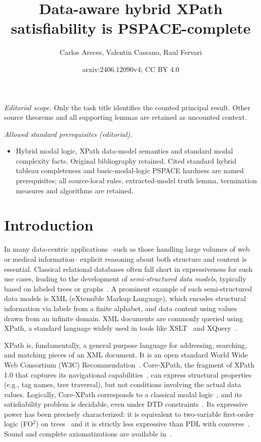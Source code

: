\documentclass[10pt,a4paper]{amsart}
\title{Data-aware hybrid XPath satisfiability is PSPACE-complete}
\author{Carlos Areces, Valentin Cassano, Raul Fervari}
\date{arxiv:2406.12090v4; CC BY 4.0}
\theoremstyle{definition}
\theoremstyle{remark}
\begin{document}
\maketitle
\noindent\textit{Editorial scope.} Only the task title identifies the counted principal result. Other source theorems and all supporting lemmas are retained as uncounted context.\par\medskip
\noindent\textit{Allowed standard prerequisites (editorial).}\begin{itemize}
\item Hybrid modal logic, XPath data-model semantics and standard modal complexity facts. Original bibliography retained. Cited standard hybrid tableau completeness and basic-modal-logic PSPACE hardness are named prerequisites; all source-local rules, extracted-model truth lemma, termination measures and algorithms are retained.
\end{itemize}\medskip
\section{Introduction}
\label{sec:intro}


In many data-centric applications --such as those handling large volumes of web or medical information-- explicit reasoning about both structure and content is essential. Classical relational databases often fall short in expressiveness for such use cases, leading to the development of \emph{semi-structured data models}, typically based on labeled trees or graphs~\cite{Bune:semi97,Abit:data99}. A prominent example of such semi-structured data models is XML (eXtensible Markup Language), which encodes structural information via labels from a finite alphabet, and data content using values drawn from an infinite domain. XML documents are commonly queried using XPath, a standard language widely used in tools like XSLT~\cite{xslt:w3c} and XQuery~\cite{xquery:w3c}.  

XPath is, fundamentally, a general purpose language for
addressing, searching, and matching pieces of an XML document. It is an open standard
World Wide Web Consortium (W3C) Recommendation~\cite{xpath:w3c}.
Core-XPath, the fragment of XPath 1.0 that captures its navigational capabilities~\cite{GKP05}, can express structural properties (e.g., tag names, tree traversal), but not conditions involving the actual data values. Logically, Core-XPath corresponds to a classical modal logic~\cite{blackburn2001modal,blackburn06}, and its satisfiability problem is decidable, even under DTD constraints~\cite{M04,BFG08}. Its expressive power has been precisely characterized: it is equivalent to two-variable first-order logic (FO$^2$) on trees~\cite{MdR05} and it is strictly less expressive than PDL with converse~\cite{BK08}. Sound and complete axiomatizations are available in~\cite{CateM09,cateLM10}.
\end{document}
